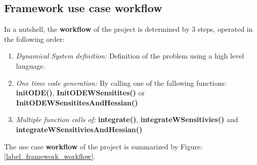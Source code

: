\documentclass[12pt, letterpaper]{article}
\begin{document}
\subsection{Framework use case workflow}
\label{label_UseCaseWorkflow}

In a nutshell, the \textbf{workflow} of the project is determined by 3 steps, operated in the following order:

\begin{enumerate}
	\item \textit{Dynamical System definition:} Definition of the problem using a high level language.
	\item \textit{One time code generation:} By calling one of the fallowing functions: \textbf{initODE()}, \textbf{InitODEWSensitites()} or \textbf{ InitODEWSensititesAndHessian()}
	\item \textit{Multiple function calls of:} \textbf{integrate()}, \textbf{integrateWSensitivies()} and \textbf{integrateWSensitiviesAndHessian()}
\end{enumerate}

  

The use case \textbf{workflow} of the project is summarized by Figure:\ref{label_framework_workflow}.
\\
\\
\end{document}
